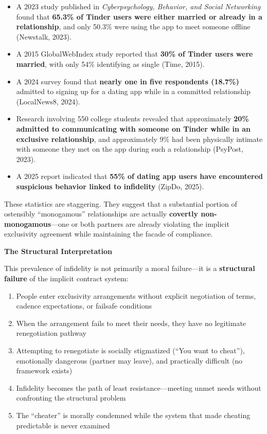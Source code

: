 \documentclass[12pt,openany]{book}
\numberwithin{equation}{chapter}
\begin{document}
\begin{itemize}
    \item A 2023 study published in \textit{Cyberpsychology, Behavior, and Social Networking} found that \textbf{65.3\% of Tinder users were either married or already in a relationship}, and only 50.3\% were using the app to meet someone offline (Newstalk, 2023).
    
    \item A 2015 GlobalWebIndex study reported that \textbf{30\% of Tinder users were married}, with only 54\% identifying as single (Time, 2015).
    
    \item A 2024 survey found that \textbf{nearly one in five respondents (18.7\%)} admitted to signing up for a dating app while in a committed relationship (LocalNews8, 2024).
    
    \item Research involving 550 college students revealed that approximately \textbf{20\% admitted to communicating with someone on Tinder while in an exclusive relationship}, and approximately 9\% had been physically intimate with someone they met on the app during such a relationship (PsyPost, 2023).
    
    \item A 2025 report indicated that \textbf{55\% of dating app users have encountered suspicious behavior linked to infidelity} (ZipDo, 2025).
\end{itemize}

These statistics are staggering. They suggest that a substantial portion of ostensibly ``monogamous'' relationships are actually \textbf{covertly non-monogamous}---one or both partners are already violating the implicit exclusivity agreement while maintaining the facade of compliance.

\textbf{The Structural Interpretation}

This prevalence of infidelity is not primarily a moral failure---it is a \textbf{structural failure} of the implicit contract system:

\begin{enumerate}
    \item People enter exclusivity arrangements without explicit negotiation of terms, cadence expectations, or failsafe conditions
    \item When the arrangement fails to meet their needs, they have no legitimate renegotiation pathway
    \item Attempting to renegotiate is socially stigmatized (``You want to cheat''), emotionally dangerous (partner may leave), and practically difficult (no framework exists)
    \item Infidelity becomes the path of least resistance---meeting unmet needs without confronting the structural problem
    \item The ``cheater'' is morally condemned while the system that made cheating predictable is never examined
\end{enumerate}
\end{document}
